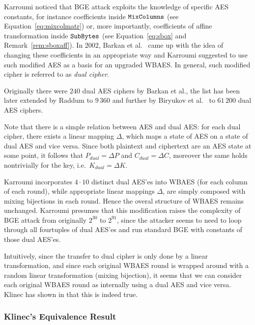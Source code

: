 	Karroumi noticed that BGE attack exploits the knowledge of specific AES constants, for instance coefficients inside $\texttt{MixColumns}$ (see Equation~\ref{eq:mixcolmatr}) or, more importantly, coefficients of affine transformation inside $\texttt{SubBytes}$ (see Equation~\ref{eq:sbox} and Remark~\ref{rem:sboxaff}). In 2002, Barkan et al.\ \cite{barkan2002many} came up with the idea of changing these coefficients in an appropriate way and Karroumi suggested to use such modified AES as a basis for an upgraded WBAES. In general, such modified cipher is referred to as {\em dual cipher}.
	
	Originally there were $240$ dual AES ciphers by Barkan et al., the list has been later extended by Raddum \cite{raddum2004more} to $9\,360$ and further by Biryukov et al.\ \cite{biryukov2003toolbox} to $61\,200$ dual AES ciphers.
	
	Note that there is a simple relation between AES and dual AES: for each dual cipher, there exists a linear mapping $\Delta$, which maps a state of AES on a state of dual AES and vice versa. Since both plaintext and ciphertext are an AES state at some point, it follows that $P_{dual} = \Delta P$ and $C_{dual} = \Delta C$, moreover the same holds nontrivially for the key, i.e.\ $K_{dual} = \Delta K$.
	
	Karroumi incorporates $4\cdot 10$ distinct dual AES'es into WBAES (for each column of each round), while appropriate linear mappings $\Delta$, are simply composed with mixing bijections in each round. Hence the overal structure of WBAES remains unchanged. Karroumi presumes that this modification raises the complexity of BGE attack from originally $2^{30}$ to $2^{91}$, since the attacker seems to need to loop through all fourtuples of dual AES'es and run standard BGE with constants of those dual AES'es.
	
	Intuitively, since the transfer to dual cipher is only done by a linear transformation, and since each original WBAES round is wrapped around with a random linear transformation (mixing bijection), it seems that we can consider each original WBAES round as internally using a dual AES and vice versa. Klinec has shown in \cite[Proposition~2]{klinec2013white} that this is indeed true.

\subsubsection{Klinec's Equivalence Result}
	
